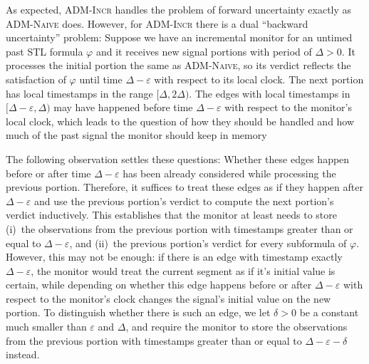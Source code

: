 As expected, \textsc{ADM-Incr} handles the problem of forward uncertainty exactly as \textsc{ADM-Naive} does.
However, for \textsc{ADM-Incr} there is a dual ``backward uncertainty'' problem:
Suppose we have an incremental monitor for an untimed past STL formula $\varphi$ and it receives new signal portions with period of $\Delta > 0$.
It processes the initial portion the same as \textsc{ADM-Naive}, so its verdict reflects the satisfaction of $\varphi$ until time $\Delta - \varepsilon$ with respect to its local clock.
The next portion has local timestamps in the range $[\Delta, 2\Delta)$.
The edges with local timestamps in $[\Delta - \varepsilon, \Delta)$ may have happened before time $\Delta - \varepsilon$ with respect to the monitor's local clock, which leads to the question of how they should be handled and how much of the past signal the monitor should keep in memory

The following observation settles these questions:
Whether these edges happen before or after time $\Delta - \varepsilon$ has been already considered while processing the previous portion.
Therefore, it suffices to treat these edges as if they happen after $\Delta - \varepsilon$ and use the previous portion's verdict to compute the next portion's verdict inductively.
This establishes that the monitor at least needs to store (i)~the observations from the previous portion with timestamps greater than or equal to $\Delta - \varepsilon$, and (ii)~the previous portion's verdict for every subformula of $\varphi$.
However, this may not be enough: if there is an edge with timestamp exactly $\Delta - \varepsilon$, the monitor would treat the current segment as if it's initial value is certain, while depending on whether this edge happens before or after $\Delta - \varepsilon$ with respect to the monitor's clock changes the signal's initial value on the new portion.
To distinguish whether there is such an edge, we let $\delta > 0$ be a constant much smaller than $\varepsilon$ and $\Delta$, and require the monitor to store the observations from the previous portion with timestamps greater than or equal to $\Delta - \varepsilon - \delta$ instead.

